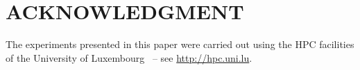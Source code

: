 \documentclass[letterpaper, 10 pt, conference]{ieeeconf}  %
\begin{document}
\section*{ACKNOWLEDGMENT}

 The experiments presented in this paper were carried out
using the HPC facilities of the University of Luxembourg~\cite{VBCG_HPCS14} 
{\small -- see \url{http://hpc.uni.lu}}.




 

\end{document}
